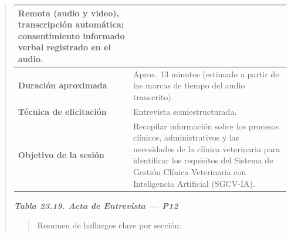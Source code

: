 \documentclass[
]{article}
\begin{document}
\begin{quote}
{\begin{longtable}[]{|
  >{\raggedright\arraybackslash}p{}|
  >{\raggedright\arraybackslash}p{}|}
\begin{minipage}[t]{\linewidth}
Remota (audio y video), transcripción automática; consentimiento informado verbal registrado en el audio.
\end{minipage} \\
\hline
\textbf{Duración aproximada} & \begin{minipage}[t]{\linewidth}\raggedright
Aprox. 13 minutos (estimado a partir de las marcas de tiempo del audio transcrito).
\end{minipage} \\
\hline
\textbf{Técnica de elicitación} & \begin{minipage}[t]{\linewidth}\raggedright
Entrevista semiestructurada.
\end{minipage} \\
\hline
\textbf{Objetivo de la sesión} & \begin{minipage}[t]{\linewidth}\raggedright
Recopilar información sobre los procesos clínicos, administrativos y las necesidades de la clínica veterinaria para identificar los requisitos del Sistema de Gestión Clínica Veterinaria con Inteligencia Artificial (SGCV-IA).
\end{minipage} \\
\hline
\end{longtable}
}

\protect{}\label{_bookmark_P12_acta}{}\emph{\textbf{Tabla 23.19. Acta de Entrevista --- P12}}

\begin{quote}
Resumen de hallazgos clave por sección:
\end{quote}


\end{quote}
\end{document}
